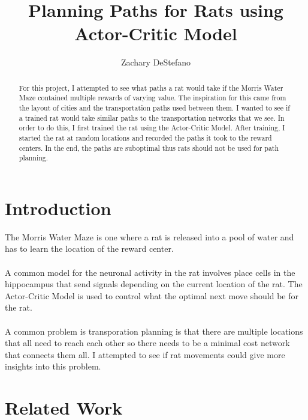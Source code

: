 \documentclass[conference]{IEEEtran}
\begin{document}
\title{Planning Paths for Rats using Actor-Critic Model}


\author{Zachary DeStefano}

\maketitle


\begin{abstract}
For this project, I attempted to see what paths a rat would take if the Morris Water Maze contained multiple rewards of varying value. The inspiration for this came from the layout of cities and the transportation paths used between them. I wanted to see if a trained rat would take similar paths to the transportation networks that we see. In order to do this, I first trained the rat using the Actor-Critic Model. After training, I started the rat at random locations and recorded the paths it took to the reward centers. In the end, the paths are suboptimal thus rats should not be used for path planning. 
\end{abstract}

\IEEEpeerreviewmaketitle



\section{Introduction}

The Morris Water Maze is one where a rat is released into a pool of water and has to learn the location of the reward center. \\
\\
A common model for the neuronal activity in the rat involves place cells in the hippocampus that send signals depending on the current location of the rat. The Actor-Critic Model is used to control what the optimal next move should be for the rat. \\
\\
A common problem is transporation planning is that there are multiple locations that all need to reach each other so there needs to be a minimal cost network that connects them all. I attempted to see if rat movements could give more insights into this problem. \\

\section{Related Work}
\end{document}
